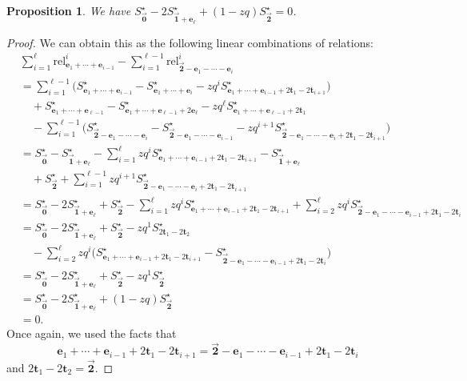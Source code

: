 \documentclass[10pt,a4paper]{amsart}
\numberwithin{equation}{section}
\newtheorem{Proposition}[Theorem]{Proposition}
\theoremstyle{definition}
\newcommand{\rel}{\text{rel}}
\newcommand{\tr}{\mathbf{t}}
\newcommand{\ee}{\mathbf{e}}
\newcommand{\two}{\vec{\mathbf{2}}}
\newcommand{\one}{\vec{\mathbf{1}}}
\newcommand{\zero}{\vec{\mathbf{0}}}
\begin{document}
\begin{Proposition} \label{prop:comp1_AB}
We have $S^\star_{\zero} - 2S^\star_{\one+\ee_\ell} + (1-zq) S^\star_{\two}=0$.
\end{Proposition}
\begin{proof}
We can obtain this as the following linear combinations of relations:
\begin{align*}
&\sum_{i=1}^\ell \rel^i_{\ee_1+\cdots+\ee_{i-1}} - \sum_{i=1}^{\ell-1}\rel^i_{\two-\ee_1-\cdots-\ee_i} \\
&=\sum_{i=1}^{\ell-1} \bigl(
S^\star_{\ee_1+\cdots+\ee_{i-1}} - S^\star_{\ee_1+\cdots+\ee_i} - zq^{i} S^\star_{\ee_1+\cdots+\ee_{i-1}+2\tr_1-2\tr_{i+1}}\bigr) \\
&\quad+S^\star_{\ee_1+\cdots+\ee_{\ell-1}} - S^\star_{{\ee_1+\cdots+\ee_{\ell-1}}+2\ee_\ell} - zq^{\ell} S^\star_{{\ee_1+\cdots+\ee_{\ell-1}}+2\tr_1} \\
&\quad- \sum_{i=1}^{\ell-1}\bigl(
S^\star_{\two-\ee_1-\cdots-\ee_i} - S^\star_{\two-\ee_1-\cdots-\ee_{i-1}} - zq^{i+1} S^\star_{\two-\ee_1-\cdots-\ee_i+2\tr_1-2\tr_{i+1}}\bigr) \\
&=
S^\star_{\zero} - S^\star_{\one+\ee_\ell} - \sum_{i=1}^{\ell} zq^{i} S^\star_{\ee_1+\cdots+\ee_{i-1}+2\tr_1-2\tr_{i+1}} -
S^\star_{\one+\ee_\ell}\\
&\quad + S^\star_{\two} + \sum_{i=1}^{\ell-1}zq^{i+1} S^\star_{\two-\ee_1-\cdots-\ee_i+2\tr_1-2\tr_{i+1}} \\
&=
S^\star_{\zero} -2S^\star_{\one+\ee_\ell} + S^\star_{\two} - \sum_{i=1}^\ell zq^{i} S^\star_{\ee_1+\cdots+\ee_{i-1}+2\tr_1-2\tr_{i+1}} + \sum_{i=2}^{\ell}zq^{i} S^\star_{\two-\ee_1-\cdots-\ee_{i-1}+2\tr_1-2\tr_{i}} \\
&= S^\star_{\zero} -2S^\star_{\one+\ee_\ell} + S^\star_{\two} -
 zq^{1} S^\star_{2\tr_1-2\tr_{2}}\\
 &\quad -\sum_{i=2}^\ell zq^{i} \bigl(S^\star_{\ee_1+\cdots+\ee_{i-1}+2\tr_1-2\tr_{i+1}} -S^\star_{\two-\ee_1-\cdots-\ee_{i-1}+2\tr_1-2\tr_{i}}\bigr) \\
&= S^\star_{\zero} - 2S^\star_{\one+\ee_\ell} + S^\star_{\two} -
 zq^{1} S^\star_{\two} \\
&= S^\star_{\zero} - 2S^\star_{\one+\ee_\ell} + (1-zq)S^\star_{\two} \\
&=0.
\end{align*}
Once again, we used the facts that \[{\ee_1+\cdots+\ee_{i-1}+2\tr_1-2\tr_{i+1}}={\two-\ee_1-\cdots-\ee_{i-1}+2\tr_1-2\tr_{i}}\] and $2\tr_1-2\tr_2=\two$.
\end{proof}
\end{document}
